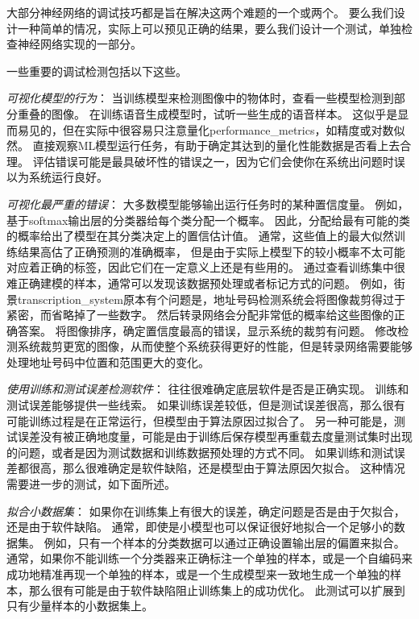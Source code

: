 
大部分神经网络的调试技巧都是旨在解决这两个难题的一个或两个。
要么我们设计一种简单的情况，实际上可以预见正确的结果，要么我们设计一个测试，单独检查神经网络实现的一部分。

一些重要的调试检测包括以下这些。

\emph{可视化模型的行为}：
当训练模型来检测图像中的物体时，查看一些模型检测到部分重叠的图像。
在训练语音生成模型时，试听一些生成的语音样本。
这似乎是显而易见的，但在实际中很容易只注意量化\gls{performance_metrics}，如精度或对数似然。
直接观察\gls{ML}模型运行任务，有助于确定其达到的量化性能数据是否看上去合理。
评估错误可能是最具破坏性的错误之一，因为它们会使你在系统出问题时误以为系统运行良好。

\emph{可视化最严重的错误}：
大多数模型能够输出运行任务时的某种置信度量。
例如，基于\gls{softmax}输出层的分类器给每个类分配一个概率。
因此，分配给最有可能的类的概率给出了模型在其分类决定上的置信估计值。
通常，这些值上的最大似然训练结果高估了正确预测的准确概率，
但是由于实际上模型下的较小概率不太可能对应着正确的标签，因此它们在一定意义上还是有些用的。
通过查看训练集中很难正确建模的样本，通常可以发现该数据预处理或者标记方式的问题。
例如，街景\gls{transcription_system}原本有个问题是，地址号码检测系统会将图像裁剪得过于紧密，而省略掉了一些数字。
然后转录网络会分配非常低的概率给这些图像的正确答案。
将图像排序，确定置信度最高的错误，显示系统的裁剪有问题。
修改检测系统裁剪更宽的图像，从而使整个系统获得更好的性能，但是转录网络需要能够处理地址号码中位置和范围更大的变化。

\emph{使用训练和测试误差检测软件}：
往往很难确定底层软件是否是正确实现。
训练和测试误差能够提供一些线索。
如果训练误差较低，但是测试误差很高，那么很有可能训练过程是在正常运行，但模型由于算法原因过拟合了。
另一种可能是，测试误差没有被正确地度量，可能是由于训练后保存模型再重载去度量测试集时出现的问题，或者是因为测试数据和训练数据预处理的方式不同。
如果训练和测试误差都很高，那么很难确定是软件缺陷，还是模型由于算法原因欠拟合。
这种情况需要进一步的测试，如下面所述。


\emph{拟合小数据集}：
如果你在训练集上有很大的误差，确定问题是否是由于欠拟合，还是由于软件缺陷。
通常，即使是小模型也可以保证很好地拟合一个足够小的数据集。
例如，只有一个样本的分类数据可以通过正确设置输出层的偏置来拟合。
通常，如果你不能训练一个分类器来正确标注一个单独的样本，或是一个自编码来成功地精准再现一个单独的样本，或是一个生成模型来一致地生成一个单独的样本，那么很有可能是由于软件缺陷阻止训练集上的成功优化。
此测试可以扩展到只有少量样本的小数据集上。


